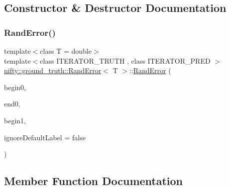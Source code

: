 \subsection{Constructor \& Destructor Documentation}
\mbox{\label{classnifty_1_1ground__truth_1_1RandError_a4ad5e727b3445b52cfe87e5f5cd68a2f}} 
\subsubsection{\texorpdfstring{Rand\+Error()}{RandError()}}
{\footnotesize\ttfamily template$<$class T  = double$>$ \\
template$<$class I\+T\+E\+R\+A\+T\+O\+R\+\_\+\+T\+R\+U\+TH , class I\+T\+E\+R\+A\+T\+O\+R\+\_\+\+P\+R\+ED $>$ \\
\hyperlink{classnifty_1_1ground__truth_1_1RandError}{nifty\+::ground\+\_\+truth\+::\+Rand\+Error}$<$ T $>$\+::\hyperlink{classnifty_1_1ground__truth_1_1RandError}{Rand\+Error} (\begin{DoxyParamCaption}\item[{I\+T\+E\+R\+A\+T\+O\+R\+\_\+\+T\+R\+U\+TH}]{begin0,  }\item[{I\+T\+E\+R\+A\+T\+O\+R\+\_\+\+T\+R\+U\+TH}]{end0,  }\item[{I\+T\+E\+R\+A\+T\+O\+R\+\_\+\+P\+R\+ED}]{begin1,  }\item[{bool}]{ignore\+Default\+Label = {\ttfamily false} }\end{DoxyParamCaption})\hspace{0.3cm}{\ttfamily [inline]}}



\subsection{Member Function Documentation}
\mbox{\label{classnifty_1_1ground__truth_1_1RandError_a818529a476307e3bb1e7081817c32ab6}} 
